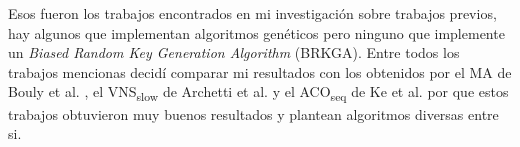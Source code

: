 \bigskip

Esos fueron los trabajos encontrados en mi investigación sobre trabajos previos, hay algunos que implementan algoritmos genéticos pero ninguno que implemente un \textit{Biased Random Key Generation Algorithm} (BRKGA). Entre todos los trabajos mencionas decidí comparar mi resultados con los obtenidos por el MA de Bouly et al. \cite{BoulyDangMoukrim}, el VNS\textsubscript{slow} de Archetti et al. \cite{ArchettiHertzSperanza} y el ACO\textsubscript{seq} de Ke et al. \cite{KeArchettiFeng} por que estos trabajos obtuvieron muy buenos resultados y plantean algoritmos diversas entre si.









